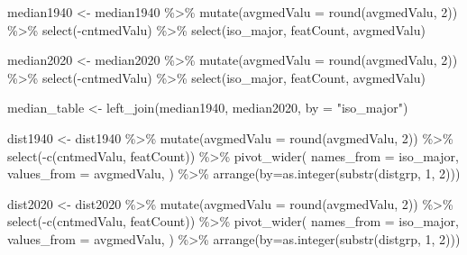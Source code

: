 \documentclass[
]{article}
\newenvironment{Shaded}{\begin{snugshade}}{\end{snugshade}}
\newcommand{\AttributeTok}[1]{\textcolor[rgb]{0.77,0.63,0.00}{#1}}
\newcommand{\DecValTok}[1]{\textcolor[rgb]{0.00,0.00,0.81}{#1}}
\newcommand{\FunctionTok}[1]{\textcolor[rgb]{0.00,0.00,0.00}{#1}}
\newcommand{\NormalTok}[1]{#1}
\newcommand{\OtherTok}[1]{\textcolor[rgb]{0.56,0.35,0.01}{#1}}
\newcommand{\SpecialCharTok}[1]{\textcolor[rgb]{0.00,0.00,0.00}{#1}}
\newcommand{\StringTok}[1]{\textcolor[rgb]{0.31,0.60,0.02}{#1}}
\begin{document}
\begin{Shaded}
\begin{Highlighting}[]
\NormalTok{median1940 }\OtherTok{\textless{}{-}}\NormalTok{ median1940 }\SpecialCharTok{\%\textgreater{}\%}
  \FunctionTok{mutate}\NormalTok{(}\AttributeTok{avgmedValu =} \FunctionTok{round}\NormalTok{(avgmedValu, }\DecValTok{2}\NormalTok{)) }\SpecialCharTok{\%\textgreater{}\%}
  \FunctionTok{select}\NormalTok{(}\SpecialCharTok{{-}}\NormalTok{cntmedValu) }\SpecialCharTok{\%\textgreater{}\%}
  \FunctionTok{select}\NormalTok{(iso\_major, featCount, avgmedValu)}

\NormalTok{median2020 }\OtherTok{\textless{}{-}}\NormalTok{ median2020 }\SpecialCharTok{\%\textgreater{}\%}
  \FunctionTok{mutate}\NormalTok{(}\AttributeTok{avgmedValu =} \FunctionTok{round}\NormalTok{(avgmedValu, }\DecValTok{2}\NormalTok{)) }\SpecialCharTok{\%\textgreater{}\%}
  \FunctionTok{select}\NormalTok{(}\SpecialCharTok{{-}}\NormalTok{cntmedValu) }\SpecialCharTok{\%\textgreater{}\%}
  \FunctionTok{select}\NormalTok{(iso\_major, featCount, avgmedValu)}

\NormalTok{median\_table }\OtherTok{\textless{}{-}} \FunctionTok{left\_join}\NormalTok{(median1940, median2020, }\AttributeTok{by =} \StringTok{"iso\_major"}\NormalTok{)}

\NormalTok{dist1940 }\OtherTok{\textless{}{-}}\NormalTok{ dist1940 }\SpecialCharTok{\%\textgreater{}\%}
  \FunctionTok{mutate}\NormalTok{(}\AttributeTok{avgmedValu =} \FunctionTok{round}\NormalTok{(avgmedValu, }\DecValTok{2}\NormalTok{)) }\SpecialCharTok{\%\textgreater{}\%}
  \FunctionTok{select}\NormalTok{(}\SpecialCharTok{{-}}\FunctionTok{c}\NormalTok{(cntmedValu, featCount)) }\SpecialCharTok{\%\textgreater{}\%}
  \FunctionTok{pivot\_wider}\NormalTok{(}
    \AttributeTok{names\_from =}\NormalTok{ iso\_major, }
    \AttributeTok{values\_from =}\NormalTok{ avgmedValu,}
\NormalTok{  ) }\SpecialCharTok{\%\textgreater{}\%}
  \FunctionTok{arrange}\NormalTok{(}\AttributeTok{by=}\FunctionTok{as.integer}\NormalTok{(}\FunctionTok{substr}\NormalTok{(distgrp, }\DecValTok{1}\NormalTok{, }\DecValTok{2}\NormalTok{)))}



\NormalTok{dist2020 }\OtherTok{\textless{}{-}}\NormalTok{ dist2020 }\SpecialCharTok{\%\textgreater{}\%}
  \FunctionTok{mutate}\NormalTok{(}\AttributeTok{avgmedValu =} \FunctionTok{round}\NormalTok{(avgmedValu, }\DecValTok{2}\NormalTok{)) }\SpecialCharTok{\%\textgreater{}\%}
  \FunctionTok{select}\NormalTok{(}\SpecialCharTok{{-}}\FunctionTok{c}\NormalTok{(cntmedValu, featCount)) }\SpecialCharTok{\%\textgreater{}\%}
  \FunctionTok{pivot\_wider}\NormalTok{(}
    \AttributeTok{names\_from =}\NormalTok{ iso\_major, }
    \AttributeTok{values\_from =}\NormalTok{ avgmedValu,}
\NormalTok{  ) }\SpecialCharTok{\%\textgreater{}\%}
  \FunctionTok{arrange}\NormalTok{(}\AttributeTok{by=}\FunctionTok{as.integer}\NormalTok{(}\FunctionTok{substr}\NormalTok{(distgrp, }\DecValTok{1}\NormalTok{, }\DecValTok{2}\NormalTok{)))}
\end{Highlighting}
\end{Shaded}
\end{document}
